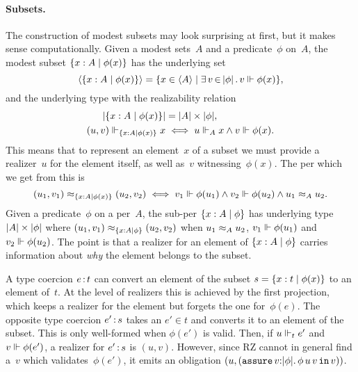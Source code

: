 \paragraph{Subsets.}
%
\iflong
%
The construction of modest subsets may look surprising at first, but
it makes sense computationally. Given a modest sets~$A$ and a
predicate~$\phi$ on~$A$, the modest subset $\{x : A \mid \phi(x)\}$
has the underlying set
%
\begin{equation*}
  \langle \{x : A \mid \phi(x)\} \rangle =
  \{x \in \langle A \rangle \mid \exists\, v \,{\in}\, |\phi|\,.\,v \Vdash \phi(x)\},
\end{equation*}
%
and the underlying type with the realizability relation
%
\begin{align*}
  |\{x : A \mid \phi(x)\}| &= |A| \times
  |\phi|,\\
  (u,v) \Vdash_{\{x : A \mid \phi(x)\}} x &\iff
  u \Vdash_A x \land v \Vdash \phi(x).
\end{align*}
%
This means that to represent an element~$x$ of a subset we must
provide a realizer~$u$ for the element itself, as well as~$v$
witnessing~$\phi(x)$. The per which we get from this is
%
\begin{equation*}
  (u_1, v_1) \approx_{\{x : A \mid \phi(x)\}} (u_2, v_2) \iff
  v_1 \Vdash \phi(u_1) \land v_2 \Vdash \phi(u_2) \land
  u_1 \approx_A u_2.
\end{equation*}
%
\else
Given a predicate~$\phi$ on a per~$A$, the sub-per $\{x : A
  \mid \phi\}$ has underlying type $|A| \times |\phi|$
where $(u_1,v_1) \approx_{\{x : A \mid \phi\}} (u_2,v_2)$ when $u_1
\approx_A u_2$, $v_1 \Vdash \phi(u_1)$ and $v_2 \Vdash \phi(u_2)$. The point is
that a realizer for an element of $\{x : A
  \mid \phi\}$ carries information about \emph{why} the element
belongs to the subset.
\fi

A type coercion $e\,{:}\,t$ can convert an element of the subset $s =
\{x : t \mid \phi(x)\}$ to an element of~$t$. At the level of
realizers this is achieved by the first projection, which keeps a
realizer for the element but forgets the one for~$\phi(e)$. The
opposite type coercion $e'\,{:}\,s$ takes an $e' \in t$ and converts it
to an element of the subset. This is only well-formed when $\phi(e')$
is valid. Then, if $u \Vdash_t e'$ and $v \Vdash \phi(e')$, a realizer for
$e'\,{:}\,s$ is $(u, v)$. However, since RZ cannot in general find
a~$v$ which validates~$\phi(e')$, it emits an obligation $(u,
(\mathtt{assure}\,v{:}|\phi|.\,\phi\,u\,v\,\mathtt{in}\,v))$.

